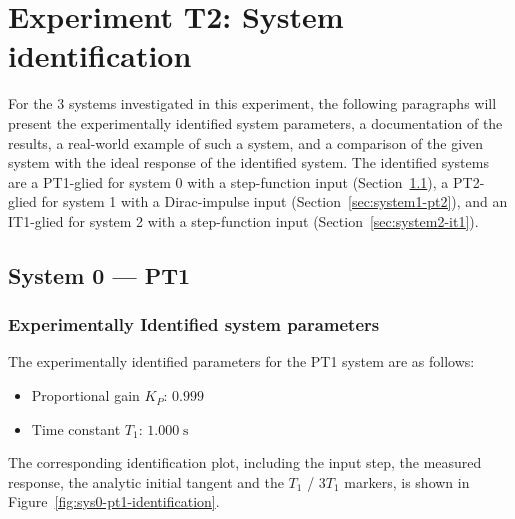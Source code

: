 \documentclass[12pt, oneside, a4paper]{scrreprt}
\begin{document}


            \cleardoublepage

        


    \chapter{Experiment T2: System identification}

        For the 3 systems investigated in this experiment, the following paragraphs will present the experimentally identified system parameters, a documentation of the results, a real-world example of such a system, and a comparison of the given system with the ideal response of the identified system. The identified systems are a PT1-glied for system 0 with a step-function input (Section~\ref{sec:system0-pt1}), a PT2-glied for system 1 with a Dirac-impulse input (Section~\ref{sec:system1-pt2}), and an IT1-glied for system 2 with a step-function input (Section~\ref{sec:system2-it1}).

        \section{System 0 --- PT1}\label{sec:system0-pt1}
            
            \subsection{Experimentally  Identified system parameters}
                    The experimentally identified parameters for the PT1 system are as follows:
                    \begin{itemize}
                        \item Proportional gain $K_P$: $0.999$
                        \item Time constant $T_1$: $1.000\;\mathrm{s}$
                    \end{itemize}
                    The corresponding identification plot, including the input step, the measured response, the analytic initial tangent and the $T_1$ / $3T_1$ markers, is shown in Figure~\ref{fig:sys0-pt1-identification}.
\end{document}
